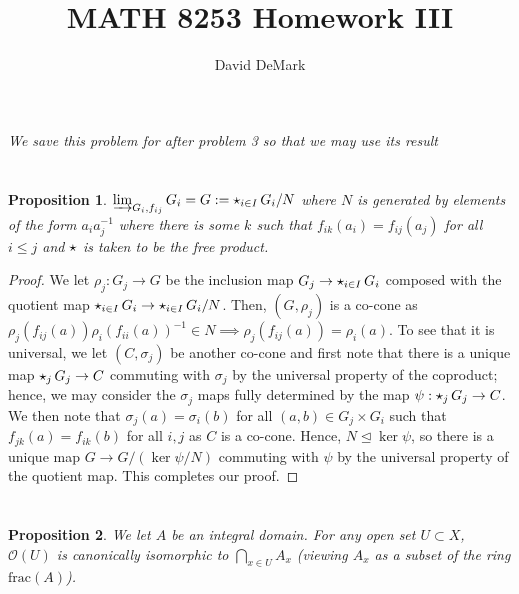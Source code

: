 \documentclass[english]{article}
\title{MATH 8253 Homework III}
\author{David DeMark}
\date{\due}
\newcommand{\OO}{\mathcal{O}}
\newcommand{\prob}[1]{\setcounter{section}{#1-1}\section{}}
\newtheorem*{proposition*}{Proposition}
\theoremstyle{remark}
\theoremstyle{definition}
\newcommand{\colim}{\varinjlim}
\newcommand{\frp}{\mathop{\large {\mathlarger{\star}}}}
\begin{document}
\maketitle
\prob{1}
\emph{We save this problem for after problem 3 so that we may use its result}
\prob{2}
\begin{proposition*}
	$\colim_{G_i,f_{ij}}G_i=G:=\frp_{i\in I} G_i/N$ where $N$ is generated by elements of the form $a_ia_j^{-1}$ where there is some $k$ such that $f_{ik}(a_i)=f_{ij}(a_j)$ for all $i\leq j$ and $\frp$ is taken to be the free product.
\end{proposition*}
\begin{proof}
	We let $\rho_j:G_j\to G$ be the inclusion map $G_j\to \frp_{i\in I}G_i$ composed with the quotient map $\frp_{i\in I}G_i\to \frp_{i\in I} G_i/N$. Then, $(G,\rho_j)$ is a co-cone as $\rho_j(f_{ij}(a))\rho_i(f_{ii}(a))^{-1}\in N\implies \rho_j(f_{ij}(a))=\rho_i(a)$. To see that it is universal, we let $(C,\sigma_j)$ be another co-cone and first note that there is a unique map $\frp_j G_j\to C$ commuting with $\sigma_j$ by the universal property of the coproduct; hence, we may consider the $\sigma_j$ maps fully determined by the map $\psi: \frp_j G_j\to C$. We then note that $\sigma_j(a)=\sigma_i(b)$ for all $(a,b)\in G_j\times G_i$ such that $f_{jk}(a)=f_{ik}(b)$ for all $i,j$ as $C$ is a co-cone. Hence, $N\trianglelefteq \ker \psi$, so there is a unique map $G\to G/(\ker \psi/N)$ commuting with $\psi$ by the universal property of the quotient map. This completes our proof.
\end{proof}
\prob{3} \begin{proposition*}
 We let $A$ be an integral domain. For any open set $U\subset X$, $\OO(U)$ is canonically isomorphic to $\bigcap_{x\in U}A_x$ (viewing $A_x$ as a subset of the ring $\mathrm{frac}(A)$). 
\end{proposition*}
\end{document}

